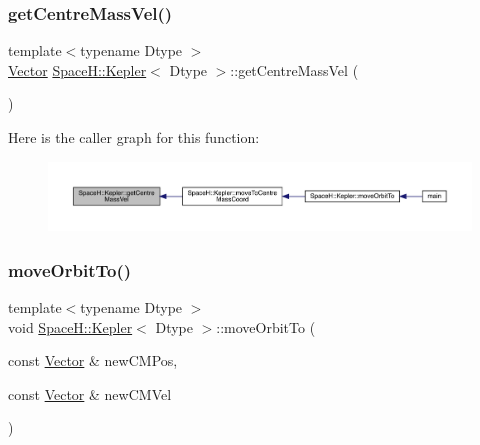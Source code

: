 \subsubsection{\texorpdfstring{get\+Centre\+Mass\+Vel()}{getCentreMassVel()}}
{\footnotesize\ttfamily template$<$typename Dtype $>$ \\
\mbox{\hyperlink{struct_space_h_1_1_kepler_aa0f5e7ecefa626a0e32a9435dd9662cd}{Vector}} \mbox{\hyperlink{struct_space_h_1_1_kepler}{Space\+H\+::\+Kepler}}$<$ Dtype $>$\+::get\+Centre\+Mass\+Vel (\begin{DoxyParamCaption}{ }\end{DoxyParamCaption})\hspace{0.3cm}{\ttfamily [inline]}}

Here is the caller graph for this function\+:
\nopagebreak
\begin{figure}[H]
\begin{center}
\leavevmode
\includegraphics[width=350pt]{struct_space_h_1_1_kepler_ab3c523b35f5d0c4f25fdf3bf46830c08_icgraph}
\end{center}
\end{figure}
\mbox{\label{struct_space_h_1_1_kepler_a3ed7500940d6d23c878a3423a6fc24d0}} 
\subsubsection{\texorpdfstring{move\+Orbit\+To()}{moveOrbitTo()}\hspace{0.1cm}{\footnotesize\ttfamily [1/2]}}
{\footnotesize\ttfamily template$<$typename Dtype $>$ \\
void \mbox{\hyperlink{struct_space_h_1_1_kepler}{Space\+H\+::\+Kepler}}$<$ Dtype $>$\+::move\+Orbit\+To (\begin{DoxyParamCaption}\item[{const \mbox{\hyperlink{struct_space_h_1_1_kepler_aa0f5e7ecefa626a0e32a9435dd9662cd}{Vector}} \&}]{new\+C\+M\+Pos,  }\item[{const \mbox{\hyperlink{struct_space_h_1_1_kepler_aa0f5e7ecefa626a0e32a9435dd9662cd}{Vector}} \&}]{new\+C\+M\+Vel }\end{DoxyParamCaption})\hspace{0.3cm}{\ttfamily [inline]}}

